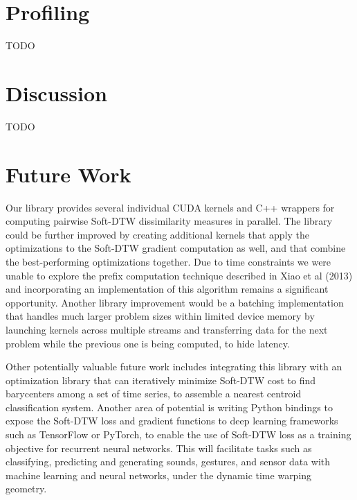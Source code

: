 \documentclass[12pt, letterpaper]{article}
\begin{document}
\FloatBarrier
\section{Profiling}

TODO



\section{Discussion}

TODO

\section{Future Work}

Our library provides several individual CUDA kernels and C++ wrappers for
computing pairwise Soft-DTW dissimilarity measures in parallel. The library
could be further improved by creating additional kernels that apply the
optimizations to the Soft-DTW gradient computation as well, and that combine the
best-performing optimizations together. Due to time constraints we were unable
to explore the prefix computation technique described in Xiao et al (2013)
\cite{xiao_parallelizing_2013} and incorporating an implementation of this
algorithm remains a significant opportunity. Another library improvement would
be a batching implementation that handles much larger problem sizes within
limited device memory by launching kernels across multiple streams and
transferring data for the next problem while the previous one is being computed,
to hide latency.

Other potentially valuable future work includes integrating this library with an
optimization library that can iteratively minimize Soft-DTW cost to find
barycenters among a set of time series, to assemble a nearest centroid
classification system. Another area of potential is writing Python bindings to
expose the Soft-DTW loss and gradient functions to deep learning frameworks such
as TensorFlow or PyTorch, to enable the use of Soft-DTW loss as a training
objective for recurrent neural networks. This will facilitate tasks such as
classifying, predicting and generating sounds, gestures, and sensor data with
machine learning and neural networks, under the dynamic time warping geometry.

\printbibliography[]
\end{document}
